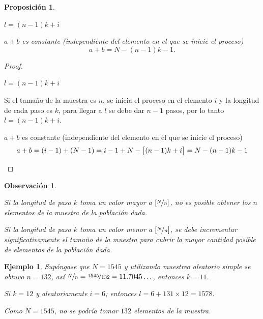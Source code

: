 \documentclass[a5paper,doc,10pt,noapacite]{apa6}
\newtheorem{proposicion}{Proposición}
\newtheorem{observ}{Observación}
\newtheorem{ejem}{Ejemplo}
\begin{document}
{{\begin{proposicion}\label{prop-6.1}\quad
	\begin{APAenumerate}
		\item \(l=(n-1)k+i\)
		\item \(a+b\) es constante (independiente del elemento en el que se inicie el proceso) \[a+b=N-(n-1)k-1.\]
	\end{APAenumerate}
\end{proposicion}
\begin{proof}\quad
	\begin{APAenumerate}
		\item \(l=(n-1)k+i\)
		
		Si el tamaño de la muestra es \(n\), se inicia el proceso en el elemento \(i\) y la longitud de cada paso es \(k\), para llegar a \(l\) se debe dar \(n-1\) pasos, por lo tanto \(l=(n-1)k+i\).
		
		\vspace{1\baselineskip}
		\item \(a+b\) es constante (independiente del elemento en el que se inicie el proceso)
		\[a+b=(i-1)+(N-1)=i-1+N-\big[(n-1)k+i\big]=N-(n-1)k-1		\qedhere\]
	\end{APAenumerate}
\end{proof}


\begin{observ}\quad
	\begin{APAenumerate}
		\item Si la longitud de paso \(k\) toma un valor mayor a \(\left[\nicefrac{N}{n}\right]\), no es posible obtener los \(n\) elementos de la muestra de la población dada.
		\item Si la longitud de paso \(k\) toma un valor menor a \(\left[\nicefrac{N}{n}\right]\), se debe incrementar significativamente el tamaño de la muestra para cubrir la mayor cantidad posible de elementos de la población dada.
	\end{APAenumerate}
\end{observ}

\begin{ejem}
	Supóngase que \(N=1545\) y utilizando muestreo aleatorio simple se obtuvo \(n=132\), así \(\nicefrac{N}{n}=\nicefrac{1545}{132}=11.7045\ldots\), entonces \(k=11\).
	
	Si \(k=12\) y aleatoriamente \(i=6\); entonces \(l=6+131 \times 12=1578\).
	
	Como \(N=1545\), no se podría tomar \(132\) elementos de la muestra.
	

\end{ejem}}}
\end{document}
